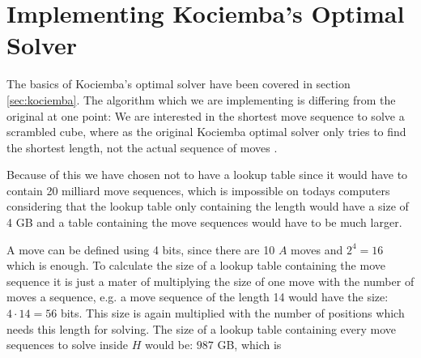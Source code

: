 \chapter{Implementing Kociemba's Optimal Solver}
\label{chap:kociembaImplement}
The basics of Kociemba's optimal solver have been covered in section \ref{sec:kociemba}. The algorithm which we are implementing is differing from the original at one point:
We are interested in the shortest move sequence to solve a scrambled cube, where as the original Kociemba optimal solver only tries to find the shortest length, not the actual sequence of moves \cite{rokicki09}.

Because of this we have chosen not to have a lookup table since it would have to contain 20 milliard move sequences, which is impossible on todays computers considering that the lookup table only containing the length would have a size of 4 GB \cite{cubeExplorer} and a table containing the move sequences would have to be much larger.

A move can be defined using 4 bits, since there are 10 $A$ moves and $2^4=16$ which is enough.
To calculate the size of a lookup table containing the move sequence it is just a mater of multiplying the size of one move with the number of moves a sequence, e.g. a move sequence of the length 14 would have the size: $4 \cdot 14 = 56$ bits. This size is again multiplied with the number of positions which needs this length for solving.
The size of a lookup table containing every move sequences to solve inside $H$ would be: $987$ GB, which is 

	
	

\myTail{}